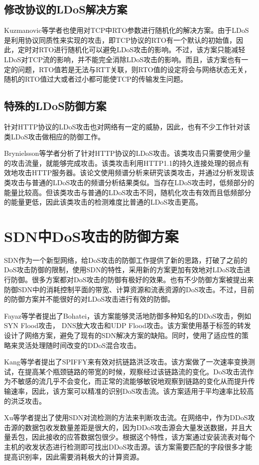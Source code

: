 \subsection{修改协议的LDoS解决方案}
\label{chap2:promodify}
Kuzmanovic\cite{Kuzmanovic2006Low}等学者也使用对TCP中RTO参数进行随机化的解决方案。由于LDoS是利用协议同质性来实现的攻击，即TCP协议的RTO有一个默认的初始值，因此，定时对RTO进行随机化可以避免LDoS攻击的影响。不过，该方案只能减轻LDoS对TCP流的影响，并不能完全消除LDoS攻击的影响。而且，该方案也有一定的问题，RTO值若是无法与RTT关联，则RTO值的设定将会与网络状态无关，随机的RTO值过大或者过小都可能使TCP的传输发生问题。


\subsection{特殊的LDoS防御方案}
\label{chap2:special-LDoS-Defense}
针对HTTP协议的LDoS攻击也对网络有一定的威胁，因此，也有不少工作针对该类LDoS攻击做相应的防御工作。

Brynielsson\cite{brynielsson2015detectability}等学者分析了针对HTTP协议的LDoS攻击。该类攻击只需要使用少量的攻击流量，就能够完成攻击。该类攻击利用HTTP1.1的持久连接处理的弱点有效地攻击HTTP服务器。该论文使用频谱分析来研究该类攻击，并通过分析发现该类攻击与普通的LDoS攻击的频谱分析结果类似。当存在LDoS攻击时，低频部分的能量比较高。但该类攻击与普通的LDoS攻击不同，随机化攻击有效而且低频部分的能量更低，因此该类攻击的检测难度比普通的LDoS攻击更高。






\section{SDN中DoS攻击的防御方案}
SDN作为一个新型网络，给DoS攻击的防御工作提供了新的思路，打破了之前的DoS攻击防御的限制，使用SDN的特性，采用新的方案更加有效地对LDoS攻击进行防御。很多方案\cite{b9, b16, b10}都对DoS攻击的防御有极好的效果。也有不少防御方案\cite{b10, b12, b13, b15, b18,wang2015floodguard,zhang2017ftguard}被提出来防御SDN中的消耗控制平面的带宽、计算资源和流表资源的DoS攻击\cite{shin2013avant,cao2017disrupting}。不过，目前的防御方案并不能很好的对LDoS攻击进行有效的防御。


Fayaz\cite{b9}等学者提出了Bohatei，该方案能够灵活地防御多种知名的DDoS攻击，例如SYN Flood攻击， DNS放大攻击和UDP Flood攻击。该方案使用基于标签的转发设计了网络方案，避免了现有的SDN解决方案的缺陷。同时，使用了适应性的策略来灵活处理随时间改变的DDoS混合攻击。

Kang\cite{b16}等学者提出了SPIFFY来有效对抗链路洪泛攻击。该方案做了一次速率变换测试，在提高某个瓶颈链路的带宽的时候，观察经过该链路流的变化。DoS攻击流作为不敏感的流几乎不会变化，而正常的流能够敏锐地观察到链路的变化从而提升传输速率，因此，该方案可以精准的识别DoS攻击流。该方案适用于平均速率比较高的洪泛攻击。

Xu\cite{b10}等学者提出了使用SDN对流检测的方法来判断攻击流。在网络中，作为DDoS攻击源的数据包收发数量差距是很大的，因为DDoS攻击源会大量发送数据，并且大量丢包，因此接收的应答数据包很少。根据这个特性，该方案通过安装流表对每个主机的收发状态进行检测即可找出DDoS攻击源。该方案需要匹配的字段很多才能提高识别率，因此需要消耗极大的计算资源。



